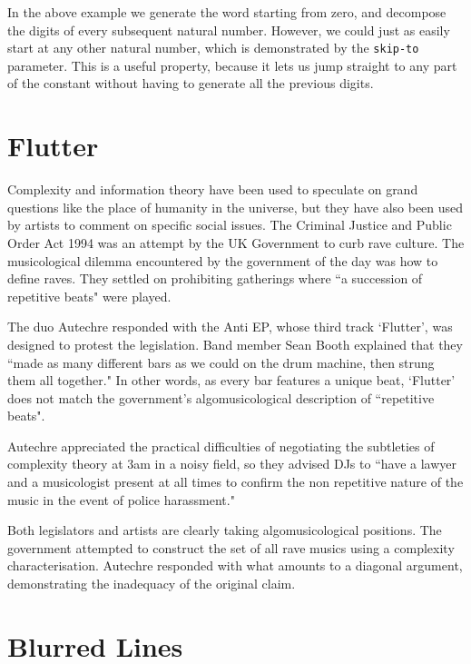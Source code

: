 \documentclass[numbers]{sigplanconf}
\begin{document}
In the above example we generate the word starting from zero, and decompose the digits of
every subsequent natural number. However, we could just as easily start at any other natural number, which is demonstrated
by the \verb|skip-to| parameter. This is a useful property, because it lets us jump straight to any part of the constant
without having to generate all the previous digits.

\section{Flutter}

Complexity and information theory have been used to speculate on grand questions like the place of humanity in the universe,
but they have also been used by artists to comment on specific social issues. The Criminal Justice and Public Order Act 1994
was an attempt by the UK Government to curb rave culture. The musicological dilemma encountered by the government of the day
was how to define raves. They settled on prohibiting gatherings where ``a succession of repetitive beats" were
played\cite{Joseph Gallivan on pop}.

The duo Autechre responded with the Anti EP\cite{Anti EP}, whose third track `Flutter', was designed to protest the legislation.
Band member
Sean Booth explained that they ``made as many different bars as we could on the drum machine, then strung them all together."
\cite{Joseph Gallivan on pop}
In other words, as every bar features a unique beat, `Flutter' does not match the government's algomusicological description
of ``repetitive beats".

Autechre appreciated the practical difficulties of negotiating the subtleties of complexity theory at 3am in a noisy field,
so they advised DJs to ``have a lawyer and a musicologist present at all times to confirm the non repetitive nature of the
music in the event of police harassment."\cite{Joseph Gallivan on pop}

Both legislators and artists are clearly taking algomusicological positions. The government attempted to construct the set
of all rave musics using a complexity characterisation. Autechre responded with what amounts to a diagonal argument, demonstrating
the inadequacy of the original claim.

\section{Blurred Lines}
\end{document}

